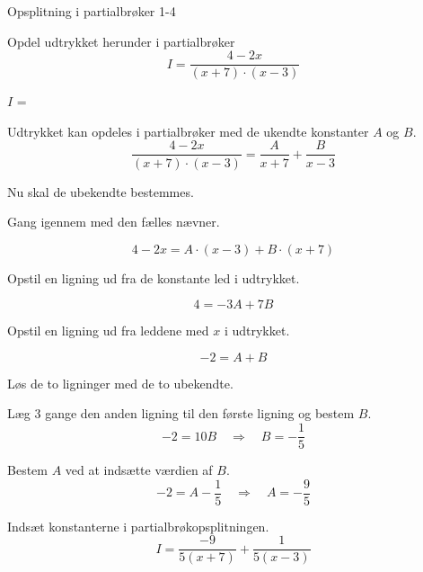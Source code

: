 \documentclass{article}
\begin{document}
\begin{exercise}{Opsplitning i partialbrøker 1-4}

Opdel udtrykket herunder i partialbrøker
\[
I = \frac{4 - 2x}{(x + 7) \cdot (x - 3)}
\]

$I$ = 

\hint
Udtrykket kan opdeles i partialbrøker med de ukendte konstanter $A$ og $B$.
\[
\frac{4 - 2x}{(x + 7) \cdot (x - 3)} =
\frac{A}{x + 7} + \frac{B}{x - 3}
\]

\hint
Nu skal de ubekendte bestemmes.

\hint
Gang igennem med den fælles nævner.

\hint
\[
4 - 2x = A \cdot (x - 3) + B \cdot (x + 7)
\]

\hint
Opstil en ligning ud fra de konstante led i udtrykket.

\hint
\[
4 = -3A + 7B
\]

\hint
Opstil en ligning ud fra leddene med $x$ i udtrykket.

\hint
\[
-2 = A + B
\]

\hint
Løs de to ligninger med de to ubekendte.

\hint
Læg 3 gange den anden ligning til den første ligning og bestem $B$.
\[
-2 = 10B \quad \Rightarrow \quad B = - \frac{1}{5}
\]

\hint
Bestem $A$ ved at indsætte værdien af $B$.
\[
-2 = A - \frac{1}{5} \quad \Rightarrow \quad A = - \frac{9}{5}
\]

\hint
Indsæt konstanterne i partialbrøkopsplitningen.
\[
I = \frac{-9}{5(x + 7)} + \frac{1}{5(x - 3)}
\]



\end{exercise}
\end{document}
